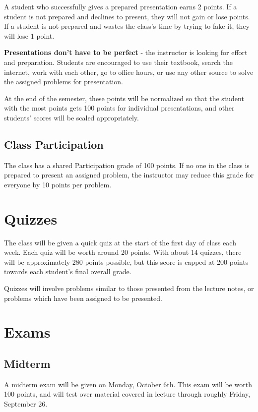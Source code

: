 \documentclass[11pt]{article}
\begin{document}
A student who successfully gives a prepared presentation earns 2 points.
If a student is not prepared and declines to present, they will not gain
or lose points.
If a student is not prepared and wastes the class's time by trying to fake it,
they will lose 1 point.

\textbf{Presentations don't have to be perfect} - the instructor is looking for
effort and preparation.
Students are encouraged to use their textbook, search the internet, work
with each other, go to office hours, or use any other source to solve the
assigned problems for presentation.

At the end of the semester, these points will be normalized so that the
student with the most points gets 100 points for individual presentations,
and other students' scores will be scaled appropriately.

\subsection{Class Participation}

The class has a shared Participation grade of 100 points.
If no one in the class is prepared to present an assigned problem, the
instructor may reduce this grade for everyone by 10 points per problem.


\section{Quizzes}

The class will be given a quick quiz at the start of the first day of class
each week. Each quiz will be worth around 20 points. With about 14 quizzes,
there will be approximately 280 points possible, but this score is capped at
200 points towards each student's final overall grade.

Quizzes will involve problems similar to those presented from the lecture
notes, or problems which have been assigned to be presented.


\newpage
\section{Exams}

\subsection{Midterm}

A midterm exam will be given on Monday, October 6th. This exam will be worth
100 points, and will test over material covered in lecture through roughly
Friday, September 26.
\end{document}
